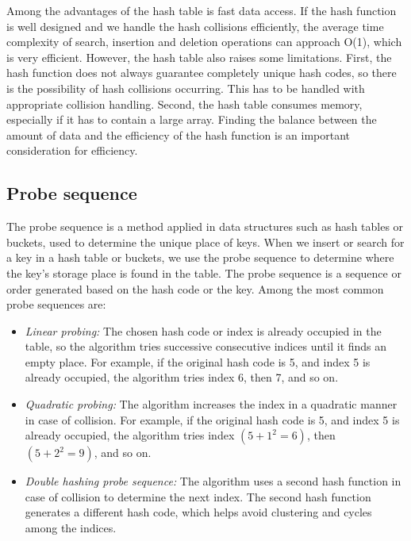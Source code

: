 \documentclass[margin=0px]{article}
\begin{document}
Among the advantages of the hash table is fast data access. If the hash function is well designed and we handle the hash collisions efficiently, the average time complexity of search, insertion and deletion operations can approach O(1), which is very efficient.
However, the hash table also raises some limitations. First, the hash function does not always guarantee completely unique hash codes, so there is the possibility of hash collisions occurring. This has to be handled with appropriate collision handling. Second, the hash table consumes memory, especially if it has to contain a large array. Finding the balance between the amount of data and the efficiency of the hash function is an important consideration for efficiency.

\subsection{Probe sequence}
The probe sequence is a method applied in data structures such as hash tables or buckets, used to determine the unique place of keys.
When we insert or search for a key in a hash table or buckets, we use the probe sequence to determine where the key's storage place is found in the table.
The probe sequence is a sequence or order generated based on the hash code or the key.
Among the most common probe sequences are:
\begin{itemize}
    \item \textit{Linear probing:} The chosen hash code or index is already occupied in the table, so the algorithm tries successive consecutive indices until it finds an empty place. For example, if the original hash code is 5, and index 5 is already occupied, the algorithm tries index 6, then 7, and so on.
    \item \textit{Quadratic probing:} The algorithm increases the index in a quadratic manner in case of collision. For example, if the original hash code is 5, and index 5 is already occupied, the algorithm tries index $(5+1^2 = 6)$, then $(5+2^2 = 9)$, and so on.
    \item \textit{Double hashing probe sequence:} The algorithm uses a second hash function in case of collision to determine the next index. The second hash function generates a different hash code, which helps avoid clustering and cycles among the indices.
\end{itemize}
\end{document}
